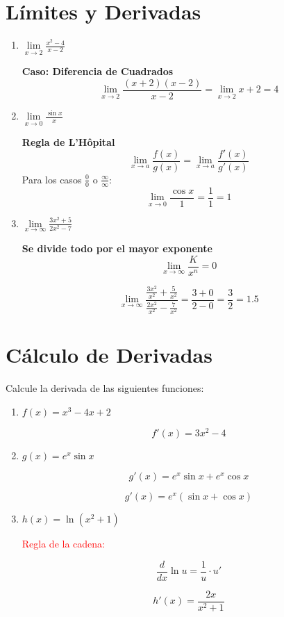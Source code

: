 \section{Límites y Derivadas}

\begin{enumerate}
    \item $ \lim\limits_{x \to 2} \frac{x^2 - 4}{x - 2} $
    
    \textbf{Caso: Diferencia de Cuadrados}
    \[ \lim\limits_{x \to 2} \frac{(x+2)(x-2)}{x-2} = \lim\limits_{x \to 2} x+2 = 4 \]
    
    \item $ \lim\limits_{x \to 0} \frac{\sin x}{x} $
    
    \textbf{Regla de L'Hôpital}
    \[ \lim\limits_{x \to a} \frac{f(x)}{g(x)} = \lim\limits_{x \to a} \frac{f'(x)}{g'(x)} \]
    Para los casos $ \frac{0}{0} $ o $ \frac{\infty}{\infty} $:
    \[ \lim\limits_{x \to 0} \frac{\cos x}{1} = \frac{1}{1} = 1 \]
    
    \item $ \lim\limits_{x \to \infty} \frac{3x^2 + 5}{2x^2 - 7} $
    
    \textbf{Se divide todo por el mayor exponente}
    \[ \lim\limits_{x \to \infty} \frac{K}{x^n} = 0 \]
    
    \[ \lim\limits_{x \to \infty} \frac{\frac{3x^2}{x^2} + \frac{5}{x^2}}{\frac{2x^2}{x^2} - \frac{7}{x^2}} = \frac{3 + 0}{2 - 0} = \frac{3}{2} = 1.5 \]
    
\end{enumerate}

\section*{Cálculo de Derivadas}

Calcule la derivada de las siguientes funciones:

\begin{enumerate}
    \item \( f(x) = x^3 - 4x + 2 \)
    
    \[
    f'(x) = 3x^2 - 4
    \]

    \item \( g(x) = e^x \sin x \)
    
    \[
    g'(x) = e^x \sin x + e^x \cos x
    \]
    
    \[
    g'(x) = e^x (\sin x + \cos x)
    \]

    \item \( h(x) = \ln(x^2 + 1) \)
    
    \textcolor{red}{Regla de la cadena:}
    
    \[
    \frac{d}{dx} \ln u = \frac{1}{u} \cdot u'
    \]
    
    \[
    h'(x) = \frac{2x}{x^2 + 1}
    \]
\end{enumerate}